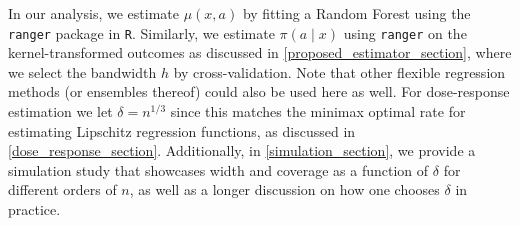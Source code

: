 \documentclass[11pt,twoside]{article}
\theoremstyle{definition}
\theoremstyle{remark}
\begin{document}
In our analysis, we estimate $\mu(x, a)$ by fitting a Random Forest using the \texttt{ranger} package in \texttt{R}. Similarly, we estimate $\pi(a \mid x)$ using \texttt{ranger} on the kernel-transformed outcomes as discussed in \cref{proposed_estimator_section}, where we select the bandwidth $h$ by cross-validation. Note that other flexible regression methods (or ensembles thereof) could also be used here as well. For dose-response estimation we let $\delta = n^{1/3}$ since this matches the minimax optimal rate for estimating Lipschitz regression functions, as discussed in \cref{dose_response_section}. Additionally, in \cref{simulation_section}, we provide a simulation study that showcases width and coverage as a function of $\delta$ for different orders of $n$, as well as a longer discussion on how one chooses $\delta$ in practice.
\end{document}
